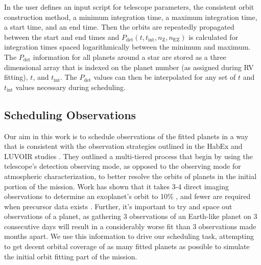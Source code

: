
In  the user defines an  input script for
telescope parameters, the consistent orbit construction method, a minimum
integration time, a maximum integration time, a start time, and an end time.
Then the orbits are repeatedly propagated between the start and end times and
$P_{\textrm{det}}(t, t_{\textrm{int}}, n_\textrm{Z}, n_\textrm{EZ})$ is
calculated for integration times spaced logarithmically between the minimum and
maximum. The $P_{\textrm{det}}$ information for all planets around a star are
stored as a three dimensional array that is indexed on the planet number (as
assigned during RV fitting), $t$, and $t_{\textrm{int}}$. The $P_\textrm{det}$
values can then be interpolated for any set of $t$ and $t_\textrm{int}$ values
necessary during scheduling.

\subsection{Scheduling Observations}

Our aim in this work is to schedule observations of the fitted planets in a way
that is consistent with the observation strategies outlined in the HabEx and
LUVOIR studies \cite{gaudiHabitableExoplanetObservatory2020,TheLUVOIRTeam2019}.
They outlined a multi-tiered process that begin by using the telescope's
detection observing mode, as opposed to the observing mode for atmospheric
characterization, to better resolve the orbits of planets in the initial
portion of the mission. Work has shown that it takes 3-4 direct imaging
observations to determine an exoplanet's orbit to 10\%
\citep{bluntOrbitsImpatient2017}, and fewer are required when precursor data
exists \citep{gaudiHabitableExoplanetObservatory2020}. Further, it's important
to try and space out observations of a planet, as gathering 3 observations of
an Earth-like planet on 3 consecutive days will result in a considerably worse
fit than 3 observations made months apart. We use this information to drive our
scheduling task, attempting to get decent orbital coverage of as many fitted
planets as possible to simulate the initial orbit fitting part of the mission.

